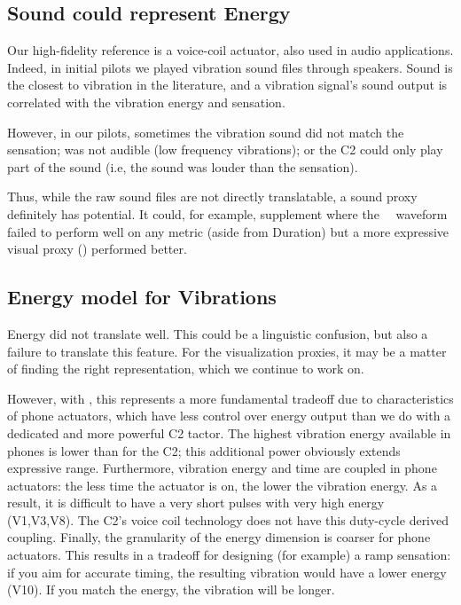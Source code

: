     \subsection{Sound could represent Energy }
Our high-fidelity reference is a voice-coil actuator, also used in audio applications.
Indeed, in initial pilots we played vibration sound files through speakers. Sound is the closest to vibration in the literature, and a vibration signal's sound output is correlated with the vibration energy and sensation. 

However, in our pilots, sometimes the vibration sound did not match the sensation; was not audible (low frequency vibrations); or the C2 could only play part of the sound (i.e, the sound was louder than the sensation).

Thus, while the raw sound files are not directly translatable, a sound proxy definitely has potential. It could, for example, supplement where the \original~\ waveform failed to perform well on any metric (aside from Duration) but a more expressive visual proxy (\linear) performed better.


    \subsection{ Energy model for Vibrations }
     Energy did not translate well.
     This could be a linguistic confusion, but also a failure to translate this feature.
     For the visualization proxies, it may be a matter of finding the right representation, which we continue to work on.
     
     However, with \lofi, this represents a more fundamental tradeoff due to characteristics of phone actuators, which have less control over energy output than we do with a dedicated and more powerful C2 tactor.
     The highest vibration energy available in phones is lower than for the C2;  this additional power obviously extends expressive range.
     Furthermore, vibration energy and time are coupled in phone actuators: the less time the actuator is on, the lower the vibration energy.
     As a result, it is difficult to have a very short pulses with very high energy (V1,V3,V8). The C2's voice coil technology does not have this duty-cycle derived coupling.
     Finally, the granularity of the energy dimension is coarser  for phone actuators.
     This results in a tradeoff for designing (for example) a ramp sensation: if you aim for accurate timing, the resulting vibration would have a lower energy (V10).
     If you match the energy, the vibration will be longer.
     
